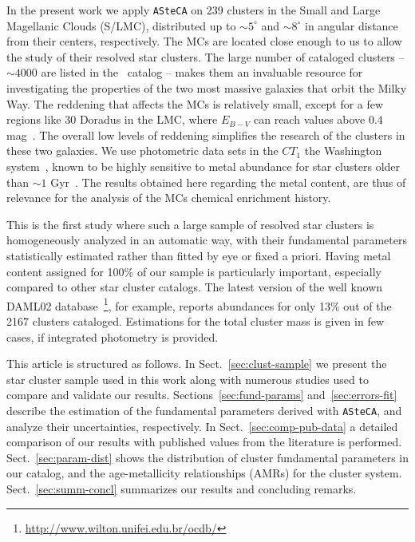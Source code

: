 \documentclass[draft]{aa}
\begin{document}
In the present work we apply \texttt{ASteCA} on 239 clusters in the Small and
Large Magellanic Clouds (S/LMC), distributed up to ${\sim}5^{\circ}$ and $
{\sim}8^{\circ}$ in angular distance from their centers, respectively.
%
The MCs are located close enough to us to allow the study of their resolved star
clusters. The large number of cataloged clusters -- $\sim4000$ are listed in
the~\cite{Bica_2008} catalog -- makes them an invaluable resource for
investigating the properties of the two most massive galaxies that orbit the
Milky Way.
%
The reddening that affects the MCs is relatively small, except for a few regions
like 30 Doradus in the LMC, where $E_{B-V}$ can reach values above $0.4$
mag~\citep{Piatti_2015b}. The overall low levels of reddening simplifies
the research of the clusters in these two galaxies.
%
We use photometric data sets in the $CT_1$ the Washington
system~\citep{Canterna_1976,Geisler_1996}, known to be highly sensitive
to metal abundance for star clusters older than ${\sim}1$
Gyr~\citep{Geisler_1999}.
The results obtained here regarding the metal content, are thus of relevance for
the analysis of the MCs chemical enrichment history.

This is the first study where such a large sample of resolved star clusters is
homogeneously analyzed in an automatic way, with their fundamental
parameters statistically estimated rather than fitted by eye or fixed a priori.
%
Having metal content assigned for 100\% of our sample is particularly
important, especially compared to other star cluster catalogs. The latest
version of the well known DAML02 database~\citep[v3.5, 2016 Jan 28;][]
{Dias_2002}\footnote{\url{http://www.wilton.unifei.edu.br/ocdb/}},
for example, reports abundances for only 13\% out of the 2167
clusters cataloged. Estimations for the total cluster mass is given in few
cases, if integrated photometry is provided.

This article is structured as follows.
In Sect.~\ref{sec:clust-sample} we present the star cluster sample used in
this work along with numerous studies used to compare and validate our
results.
Sections~\ref{sec:fund-params} and~\ref{sec:errors-fit} describe the estimation
of the fundamental parameters derived with \texttt{ASteCA}, and analyze their
uncertainties, respectively.
In Sect.~\ref{sec:comp-pub-data} a detailed comparison of our results with
published values from the literature is performed.
Sect.~\ref{sec:param-dist} shows the distribution of cluster fundamental
parameters in our catalog, and the age-metallicity relationships (AMRs) for the
cluster system.
Sect.~\ref{sec:summ-concl} summarizes our results and concluding remarks.
\end{document}
